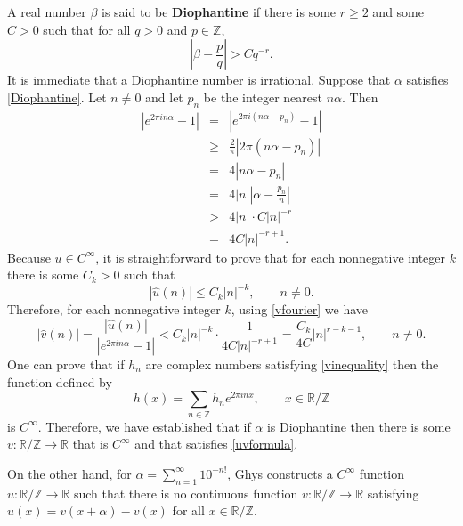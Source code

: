 \documentclass{article}
\theoremstyle{definition}
\begin{document}
A real number $\beta$ is said to be \textbf{Diophantine} if there is some $r \geq 2$ and some $C>0$ such that for all
$q>0$ and $p \in \mathbb{Z}$,
\begin{equation}
\left|\beta - \frac{p}{q} \right| > C q^{-r}.
\label{Diophantine}
\end{equation}
It is immediate that a Diophantine number is irrational. Suppose that  $\alpha$ satisfies \eqref{Diophantine}. 
Let $n \neq 0$ and let $p_n$ be the integer nearest $n\alpha$. Then
\begin{eqnarray*}
|e^{2\pi i n\alpha}-1|& =& |e^{2\pi i (n\alpha-p_n)}-1| \\
&\geq& \frac{2}{\pi} |2\pi(n\alpha-p_n)|\\
&=& 4|n\alpha-p_n|\\
&=&4|n|\left|\alpha-\frac{p_n}{n}\right|\\
&>&4|n|\cdot C|n|^{-r}\\
&=&4C |n|^{-r+1}.
\end{eqnarray*}
Because $u \in C^\infty$, it is straightforward to prove that for each nonnegative integer $k$ there is some $C_k >0$ such that 
\[
|\widehat{u}(n)| \leq C_k |n|^{-k}, \qquad n \neq 0.
\]
Therefore, for each nonnegative integer $k$, using \eqref{vfourier} we have
\begin{equation}
|\widehat{v}(n)| = \frac{|\widehat{u}(n)|}{|e^{2\pi in\alpha}-1|} < C_k |n|^{-k} \cdot \frac{1}{4C |n|^{-r+1}}
=\frac{C_k}{4C} |n|^{r-k-1}, \qquad n \neq 0.
\label{vinequality}
\end{equation}
One can prove that if $h_n$ are complex numbers satisfying 
\eqref{vinequality} then the function
defined by
\[
h(x) = \sum_{n \in \mathbb{Z}} h_n e^{2\pi i nx}, \qquad x \in \mathbb{R} / \mathbb{Z}
\]
is $C^\infty$. Therefore, we have established that if $\alpha$ is Diophantine then there is some $v:\mathbb{R} / \mathbb{Z} 
\to \mathbb{R}$ that is $C^\infty$ and that satisfies \eqref{uvformula}.

On the other hand,  for $\alpha=\sum_{n=1}^\infty 10^{-n!}$, Ghys constructs a $C^\infty$ function $u:\mathbb{R} / \mathbb{Z}
\to \mathbb{R}$ such that there is no continuous function $v:\mathbb{R} / \mathbb{Z} \to \mathbb{R}$ satisfying
$u(x)=v(x+\alpha)-v(x)$ for all $x \in \mathbb{R} / \mathbb{Z}$. 
\end{document}
